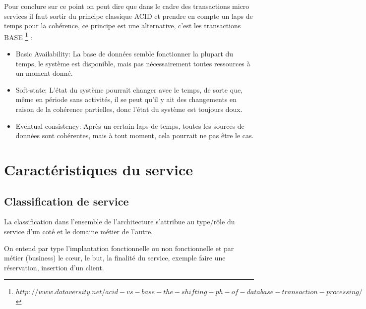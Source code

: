 \documentclass[12pt, a4paper, openany]{report}
\begin{document}
     Pour conclure sur ce point on peut dire que dans le cadre des transactions micro services il faut sortir du principe classique ACID et prendre en compte un laps de temps pour la cohérence, ce principe est une alternative, c'est les transactions BASE \footnote{$http://www.dataversity.net/acid-vs-base-the-shifting-ph-of-database-transaction-processing/$} \cite{refbibBase}: 
   \begin{itemize}
      \item Basic Availability: La base de données semble fonctionner la plupart du temps, le système est disponible, mais pas nécessairement toutes ressources à un moment donné.
      \item Soft-state: L'état du système pourrait changer avec le temps, de sorte que, même en période sans activités, il se peut qu'il y ait des changements en raison de la cohérence partielles, donc l'état du système est toujours doux.
      \item Eventual consistency: Après un certain laps de temps, toutes les sources de données sont cohérentes, mais à tout moment, cela pourrait ne pas être le cas.
   \end{itemize} 
   
 
 \section{Caractéristiques du service}
  \subsection{Classification de service}
   La classification dans l’ensemble de l’architecture s’attribue au type/rôle du service d’un coté et le domaine métier de l’autre.
   
   On entend par type l’implantation fonctionnelle ou non fonctionnelle et par métier (business) le cœur, le but, la finalité du service, exemple faire une réservation, insertion d'un client.\\
   
\end{document}
